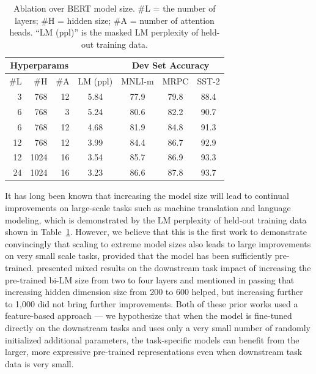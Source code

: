 \documentclass[11pt,a4paper]{article}
\begin{document}
\begin{table}[b]
\begin{center}
{\small
\begin{tabular}{@{}rrrcccc@{}}
  \toprule
  \multicolumn{3}{c}{Hyperparams}      &      & \multicolumn{3}{c}{Dev Set Accuracy} \\
  \midrule
  \#L & \#H &\#A & LM (ppl) & MNLI-m & MRPC &SST-2               \\
  \midrule
  \
   3 &  768 & 12 & 5.84 & 77.9 & 79.8 & 88.4 \\
   6 &  768 &  3 & 5.24 & 80.6 & 82.2 & 90.7 \\
   6 &  768 & 12 & 4.68 & 81.9 & 84.8 & 91.3 \\
  12 &  768 & 12 & 3.99 & 84.4 & 86.7 & 92.9 \\
  12 & 1024 & 16 & 3.54 & 85.7 & 86.9 & 93.3 \\
  24 & 1024 & 16 & 3.23 & 86.6 & 87.8 & 93.7 \\
\bottomrule
\end{tabular}
} %
\end{center}
\caption{\label{tab:size_ablation} Ablation over BERT model size. \#L = the number of layers; \#H = hidden size; \#A = number of attention heads. ``LM (ppl)'' is the masked LM perplexity of held-out training data.}
\end{table}


It has long been known that increasing the model size will lead to continual improvements on large-scale tasks such as machine translation and language modeling, which is demonstrated by the LM perplexity of held-out training data shown in Table~\ref{tab:size_ablation}. However, we believe that this is the first work to demonstrate convincingly that scaling to extreme model sizes also leads to large improvements on very small scale tasks, provided that the model has been sufficiently pre-trained. \citet{peters2018dissecting} presented mixed results on the downstream task impact of increasing the pre-trained bi-LM size from two to four layers and \citet{melamud2016context2vec} mentioned in passing that increasing hidden dimension size from 200 to 600 helped, but increasing further to 1,000 did not bring further improvements. Both of these prior works used a feature-based approach --- we hypothesize that when the model is fine-tuned directly on the downstream tasks and uses only a very small number of randomly initialized additional parameters, the task-specific models can benefit from the larger, more expressive pre-trained representations even when downstream task data is very small. 
\end{document}

